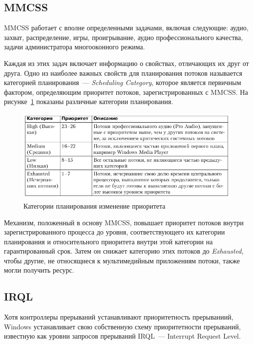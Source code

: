 \subsection{MMCSS}

MMCSS работает с вполне определенными задачами, включая следующие: аудио, захват, распределение, игры, проигрывание, аудио профессионального качества, задачи администратора многооконного режима.

Каждая из этих задач включает информацию о свойствах, отличающих их друг от друга. 
Одно из наиболее важных свойств для планирования потоков называется категорией планирования~--- \textit{Scheduling Category}, которое является первичным фактором, определяющим приоритет потоков, зарегистрированных с MMCSS. На рисунке~\ref{img:6} показаны различные категории планирования.

\begin{figure}[h]
	\centering
	\includegraphics[height=0.2\textheight]{img/6.png}
	\caption{Категории планирования изменение приоритета}
	\label{img:6}
\end{figure}

Механизм, положенный в основу MMCSS, повышает приоритет потоков
внутри зарегистрированного процесса до уровня, соответствующего их категории
планирования и относительного приоритета внутри этой категории на гарантированный срок. 
Затем он снижает категорию этих потоков до \textit{Exhausted}, чтобы другие, не относящиеся к мультимедийным приложениям потоки, также могли получить ресурс.

\subsection{IRQL}

Хотя контроллеры прерываний устанавливают приоритетность прерываниий, Windows устанавливает свою собственную схему приоритетности прерываний, известную как уровни запросов прерываний IRQL~--- Interrupt Request Level. 

